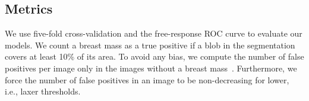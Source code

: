 \subsection{Metrics}
We use five-fold cross-validation and the free-response ROC curve to evaluate our models. We count a breast mass as a true positive if a blob in the segmentation covers at least 10\% of its area. To avoid any bias, we compute the number of false positives per image only in the images without a breast mass~\cite{Chakraborty2013}. Furthermore, we force the number of false positives in an image to be non-decreasing for lower, i.e., laxer thresholds.
